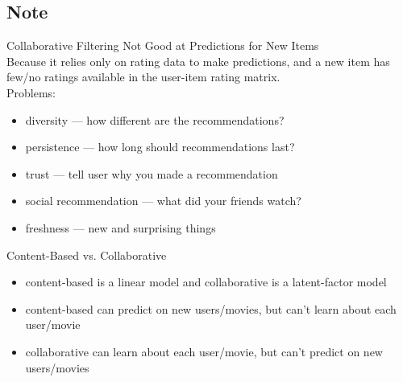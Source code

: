 \documentclass[10pt,landscape,a4paper]{article}
\begin{document}
\begin{multicols*}{5}
\subsection{Note}
Collaborative Filtering Not Good at Predictions for New Items \\
Because it relies only on rating data to make predictions, and a new item has few/no ratings available in the user-item rating matrix. \\
Problems:
\begin{itemize}
    \item diversity --- how different are the recommendations?
    \item persistence --- how long should recommendations last?
    \item trust --- tell user why you made a recommendation
    \item social recommendation --- what did your friends watch?
    \item freshness --- new and surprising things
\end{itemize}
Content-Based vs. Collaborative
\begin{itemize}
    \item content-based is a linear model and collaborative is a latent-factor model
    \item content-based can predict  on new users/movies, but can't learn about each user/movie
    \item collaborative can learn about each user/movie, but can't predict on new users/movies
\end{itemize}


\end{multicols*}
\end{document}
